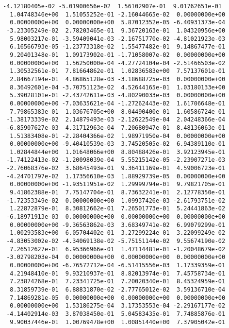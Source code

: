 \documentclass[11pt]{article}
\begin{document}
\begin{Verbatim}[commandchars=\\\{\}]
 -4.12180405e-02 -5.01900656e-02  1.56102907e-01  9.01762651e-01
  1.04748346e+00  1.51055252e-01 -2.16044665e-02  0.00000000e+00
  0.00000000e+00  0.00000000e+00  5.87012352e-05 -6.40931373e-04
 -3.23305249e-02  2.78203465e-01  9.36720163e-01  1.04320956e+00
  5.98003217e-01 -3.59409041e-03 -2.16751770e-02 -4.81021923e-03
  6.16566793e-05 -1.23773318e-02  1.55477482e-01  9.14867477e-01
  9.20401348e-01  1.09173902e-01 -1.71058007e-02  0.00000000e+00
  0.00000000e+00  1.56250000e-04 -4.27724104e-04 -2.51466503e-02
  1.30532561e-01  7.81664862e-01  1.02836583e+00  7.57137601e-01
  2.84667194e-01  4.86865128e-03 -3.18688725e-03  0.00000000e+00
  8.36492601e-04 -3.70751123e-02  4.52644165e-01  1.03180133e+00
  5.39028101e-01 -2.43742611e-03 -4.80290033e-03  0.00000000e+00
  0.00000000e+00 -7.03635621e-04 -1.27262443e-02  1.61706648e-01
  7.79865383e-01  1.03676705e+00  8.04490400e-01  1.60586724e-01
 -1.38173339e-02  2.14879493e-03 -2.12622549e-04  2.04248366e-04
 -6.85907627e-03  4.31712963e-04  7.20680947e-01  8.48136063e-01
  1.51383408e-01 -2.28404366e-02  1.98971950e-04  0.00000000e+00
  0.00000000e+00 -9.40410539e-03  3.74520505e-02  6.94389110e-01
  1.02844844e+00  1.01648066e+00  8.80488426e-01  3.92123945e-01
 -1.74122413e-02 -1.20098039e-04  5.55215142e-05 -2.23907271e-03
 -2.76068376e-02  3.68645493e-01  9.36411169e-01  4.59006723e-01
 -4.24701797e-02  1.17356610e-03  1.88929739e-05  0.00000000e+00
  0.00000000e+00 -1.93511951e-02  1.29999794e-01  9.79821705e-01
  9.41862388e-01  7.75147704e-01  8.73632241e-01  2.12778350e-01
 -1.72353349e-02  0.00000000e+00  1.09937426e-03 -2.61793751e-02
  1.22872879e-01  8.30812662e-01  7.26501773e-01  5.24441863e-02
 -6.18971913e-03  0.00000000e+00  0.00000000e+00  0.00000000e+00
  0.00000000e+00 -9.36563862e-03  3.68349741e-02  6.99079299e-01
  1.00293583e+00  6.05704402e-01  3.27299224e-01 -3.22099249e-02
 -4.83053002e-02 -4.34069138e-02 -5.75151144e-02  9.55674190e-02
  7.26512627e-01  6.95366966e-01  1.47114481e-01 -1.20048679e-02
 -3.02798203e-04  0.00000000e+00  0.00000000e+00  0.00000000e+00
  0.00000000e+00 -6.76572712e-04 -6.51415556e-03  1.17339359e-01
  4.21948410e-01  9.93210937e-01  8.82013974e-01  7.45758734e-01
  7.23874268e-01  7.23341725e-01  7.20020340e-01  8.45324959e-01
  8.31859739e-01  6.88831870e-02 -2.77765012e-02  3.59136710e-04
  7.14869281e-05  0.00000000e+00  0.00000000e+00  0.00000000e+00
  0.00000000e+00  1.53186275e-04  3.17353553e-04 -2.29167177e-02
 -4.14402914e-03  3.87038450e-01  5.04583435e-01  7.74885876e-01
  9.90037446e-01  1.00769478e+00  1.00851440e+00  7.37905042e-01

\end{Verbatim}
\end{document}
